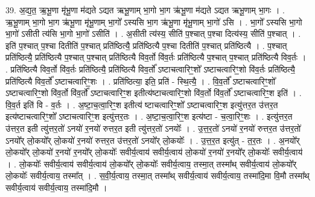 \documentclass[17pt]{extarticle}
\begin{document}
39. अ॒द्य॒त॒ ऋ॒भू॒णा मृ॑भू॒णा म॑द्यते ऽद्यत ऋभू॒णाम् भा॒गो भा॒ग ऋ॑भू॒णा म॑द्यते ऽद्यत ऋभू॒णाम् भा॒गः । . ऋ॒भू॒णाम् भा॒गो भा॒ग ऋ॑भू॒णा मृ॑भू॒णाम् भा॒गो᳚ ऽस्यसि भा॒ग ऋ॑भू॒णा मृ॑भू॒णाम् भा॒गो॑ ऽसि । . भा॒गो᳚ ऽस्यसि भा॒गो भा॒गो॑ ऽसीती त्य॑सि भा॒गो भा॒गो॑ ऽसीति॑ । . अ॒सीती त्य॑स्य॒ सीति॑ प॒श्चात् प॒श्चा दित्य॑स्य॒ सीति॑ प॒श्चात् । . इति॑ प॒श्चात् प॒श्चा दितीति॑ प॒श्चात् प्रति॑ष्ठित्यै॒ प्रति॑ष्ठित्यै प॒श्चा दितीति॑ प॒श्चात् प्रति॑ष्ठित्यै । . प॒श्चात् प्रति॑ष्ठित्यै॒ प्रति॑ष्ठित्यै प॒श्चात् प॒श्चात् प्रति॑ष्ठित्यै विव॒र्तो वि॑व॒र्तः प्रति॑ष्ठित्यै प॒श्चात् प॒श्चात् प्रति॑ष्ठित्यै विव॒र्तः । . प्रति॑ष्ठित्यै विव॒र्तो वि॑व॒र्तः प्रति॑ष्ठित्यै॒ प्रति॑ष्ठित्यै विव॒र्तो᳚ ऽष्टाचत्वारिꣳ॒॒शो᳚ ऽष्टाचत्वारिꣳ॒॒शो वि॑व॒र्तः प्रति॑ष्ठित्यै॒ प्रति॑ष्ठित्यै विव॒र्तो᳚ ऽष्टाचत्वारिꣳ॒॒शः । . प्रति॑ष्ठित्या॒ इति॒ प्रति॑ - स्थि॒त्यै॒ । . वि॒व॒र्तो᳚ ऽष्टाचत्वारिꣳ॒॒शो᳚ ऽष्टाचत्वारिꣳ॒॒शो वि॑व॒र्तो वि॑व॒र्तो᳚ ऽष्टाचत्वारिꣳ॒॒श इतीत्य॑ष्टाचत्वारिꣳ॒॒शो वि॑व॒र्तो वि॑व॒र्तो᳚ ऽष्टाचत्वारिꣳ॒॒श इति॑ । . वि॒व॒र्त इति॑ वि - व॒र्तः । . अ॒ष्टा॒च॒त्वा॒रिꣳ॒॒श इतीत्य॑ ष्टाचत्वारिꣳ॒॒शो᳚ ऽष्टाचत्वारिꣳ॒॒श इत्यु॑त्तर॒त उ॑त्तर॒त इत्य॑ष्टाचत्वारिꣳ॒॒शो᳚ ऽष्टाचत्वारिꣳ॒॒श इत्यु॑त्तर॒तः । . अ॒ष्टा॒च॒त्वा॒रिꣳ॒॒श इत्य॑ष्टा - च॒त्वा॒रिꣳ॒॒शः । . इत्यु॑त्तर॒त उ॑त्तर॒त इती त्यु॑त्तर॒तो॑ ऽनयो॑ र॒नयो॑ रुत्तर॒त इती त्यु॑त्तर॒तो॑ ऽनयोः᳚ । . उ॒त्त॒र॒तो॑ ऽनयो॑ र॒नयो॑ रुत्तर॒त उ॑त्तर॒तो॑ ऽनयो᳚र् लो॒कयो᳚र् लो॒कयो॑ र॒नयो॑ रुत्तर॒त उ॑त्तर॒तो॑ ऽनयो᳚र् लो॒कयोः᳚ । . उ॒त्त॒र॒त इत्यु॑त् - त॒र॒तः । . अ॒नयो᳚र् लो॒कयो᳚र् लो॒कयो॑ र॒नयो॑ र॒नयो᳚र् लो॒कयोः᳚ सवीर्य॒त्वाय॑ सवीर्य॒त्वाय॑ लो॒कयो॑ र॒नयो॑ र॒नयो᳚र् लो॒कयोः᳚ सवीर्य॒त्वाय॑ । . लो॒कयोः᳚ सवीर्य॒त्वाय॑ सवीर्य॒त्वाय॑ लो॒कयो᳚र् लो॒कयोः᳚ सवीर्य॒त्वाय॒ तस्मा॒त् तस्मा᳚थ् सवीर्य॒त्वाय॑ लो॒कयो᳚र् लो॒कयोः᳚ सवीर्य॒त्वाय॒ तस्मा᳚त् । . स॒वी॒र्य॒त्वाय॒ तस्मा॒त् तस्मा᳚थ् सवीर्य॒त्वाय॑ सवीर्य॒त्वाय॒ तस्मा॑दि॒मा वि॒मौ तस्मा᳚थ् सवीर्य॒त्वाय॑ सवीर्य॒त्वाय॒ तस्मा॑दि॒मौ । \newline
\end{document}
